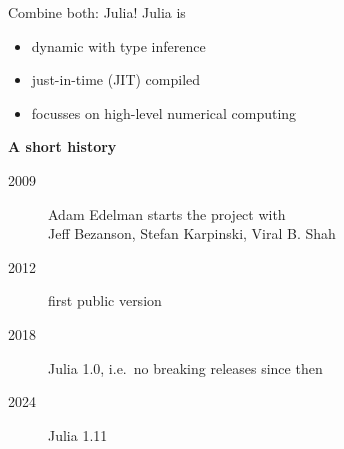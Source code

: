 \documentclass[aspectratio=169, 11pt, handout]{beamer}
\begin{document}
    \begin{frame}{Combine both: Julia!}
        \alert{Julia} is
        \begin{itemize}
            \item dynamic with type inference
            \item just-in-time (JIT) compiled
            \item focusses on high-level numerical computing
        \end{itemize}
        \pause
        \vspace{\baselineskip}
        \textbf{\alert{A short history}}
        \begin{description}
            \item[2009] Adam Edelman starts the project with\\
            Jeff Bezanson, Stefan Karpinski, Viral B. Shah
            \item[2012] first public version
            \item[2018] Julia 1.0, i.e.\, no breaking releases since then
            \item[2024] Julia 1.11
        \end{description}
    \end{frame}
\end{document}
